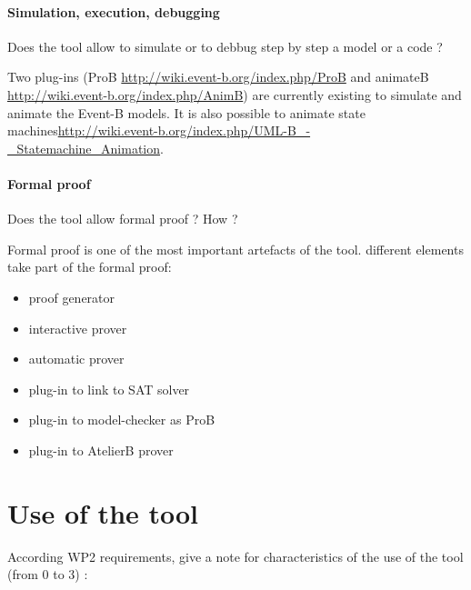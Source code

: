 \paragraph{Simulation, execution, debugging}
Does the tool allow to simulate or to debbug step by step a model or a code ?

\begin{author_comment}

Two plug-ins (ProB \url{http://wiki.event-b.org/index.php/ProB} and animateB \url{http://wiki.event-b.org/index.php/AnimB}) are currently existing to simulate and animate the Event-B models. It is also possible to animate state machines\url{http://wiki.event-b.org/index.php/UML-B_-_Statemachine_Animation}.
\end{author_comment}

\paragraph{Formal proof}
Does the tool allow formal proof ?  How ?

\begin{author_comment}

Formal proof is one of the most important artefacts of the tool. different elements take part of the formal proof:
\begin{itemize}
\item proof generator
\item interactive prover
\item automatic prover
\item plug-in to link to SAT solver
\item plug-in to model-checker as ProB
\item plug-in to AtelierB prover
\end{itemize}
\end{author_comment}


\section{Use of the tool}


According WP2 requirements, give a note for characteristics of the use of the tool (from 0 to 3) :

